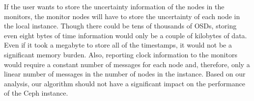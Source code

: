 If the user wants to store the uncertainty information of the nodes in
the monitors, the monitor nodes will have to store the uncertainty of
each node in the local instance. Though there could be tens of
thousands of OSDs, storing even eight bytes of time information would
only be a couple of kilobytes of data. Even if it took a megabyte to
store all of the timestamps, it would not be a significant memory
burden. Also, reporting clock information to the monitors would
require a constant number of messages for each node and, therefore,
only a linear number of messages in the number of nodes in the
instance.  Based on our analysis, our algorithm should not have a
significant impact on the performance of the Ceph instance.
